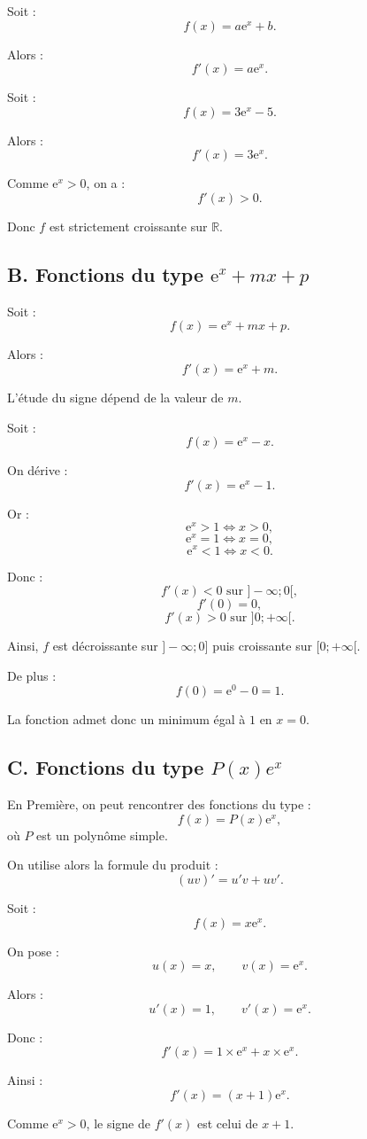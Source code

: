 \documentclass[11pt,a4paper]{article}
\newcommand{\R}{\mathbb{R}}
\newcommand{\e}{\mathrm{e}}
\begin{document}
Soit :
\[
f(x)=a\e^x+b.
\]

Alors :
\[
f'(x)=a\e^x.
\]

\begin{exemplebox}
Soit :
\[
f(x)=3\e^x-5.
\]

Alors :
\[
f'(x)=3\e^x.
\]

Comme $\e^x>0$, on a :
\[
f'(x)>0.
\]

Donc $f$ est strictement croissante sur $\R$.
\end{exemplebox}

\subsection*{B. Fonctions du type $\e^x+mx+p$}

Soit :
\[
f(x)=\e^x+mx+p.
\]

Alors :
\[
f'(x)=\e^x+m.
\]

L'étude du signe dépend de la valeur de $m$.

\begin{exemplebox}
Soit :
\[
f(x)=\e^x-x.
\]

On dérive :
\[
f'(x)=\e^x-1.
\]

Or :
\[
\e^x>1 \Longleftrightarrow x>0,
\]
\[
\e^x=1 \Longleftrightarrow x=0,
\]
\[
\e^x<1 \Longleftrightarrow x<0.
\]

Donc :
\[
f'(x)<0 \text{ sur } ]-\infty;0[,
\]
\[
f'(0)=0,
\]
\[
f'(x)>0 \text{ sur } ]0;+\infty[.
\]

Ainsi, $f$ est décroissante sur $]-\infty;0]$ puis croissante sur $[0;+\infty[$.

De plus :
\[
f(0)=\e^0-0=1.
\]

La fonction admet donc un minimum égal à $1$ en $x=0$.
\end{exemplebox}

\subsection*{C. Fonctions du type $P(x)e^x$}

En Première, on peut rencontrer des fonctions du type :
\[
f(x)=P(x)\e^x,
\]
où $P$ est un polynôme simple.

On utilise alors la formule du produit :
\[
(uv)'=u'v+uv'.
\]

\begin{exemplebox}
Soit :
\[
f(x)=x\e^x.
\]

On pose :
\[
u(x)=x,
\qquad
v(x)=\e^x.
\]

Alors :
\[
u'(x)=1,
\qquad
v'(x)=\e^x.
\]

Donc :
\[
f'(x)=1\times \e^x+x\times \e^x.
\]

Ainsi :
\[
f'(x)=(x+1)\e^x.
\]

Comme $\e^x>0$, le signe de $f'(x)$ est celui de $x+1$.
\end{exemplebox}
\end{document}
